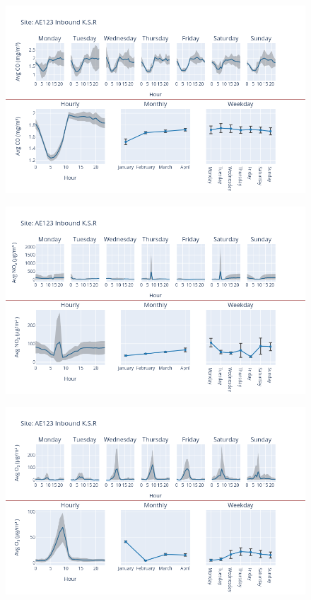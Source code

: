 \documentclass[12pt, oneside]{book}
\begin{document}
{ 
{\begin{figure}[H] 
 \centering 
\includegraphics[width=.88\textwidth, keepaspectratio]{image26} 
 \end{figure}}{} 

{\begin{figure}[H] 
 \centering 
\includegraphics[width=.88\textwidth, keepaspectratio]{image27} 
 \end{figure}}{} 

{\begin{figure}[H] 
 \centering 
\includegraphics[width=.88\textwidth, keepaspectratio]{image28} 
 \end{figure}}{} 

}
\end{document}
